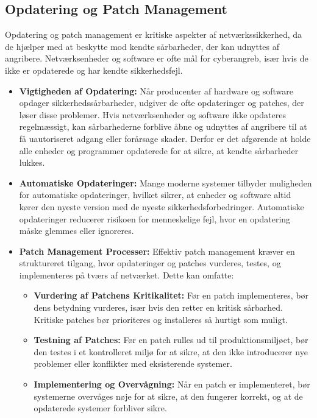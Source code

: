 \subsection{Opdatering og Patch Management}
Opdatering og patch management er kritiske aspekter af netværkssikkerhed, da de hjælper med at beskytte mod kendte sårbarheder, der kan udnyttes af angribere. Netværksenheder og software er ofte mål for cyberangreb, især hvis de ikke er opdaterede og har kendte sikkerhedsfejl.

\begin{itemize}
	\item \textbf{Vigtigheden af Opdatering:} Når producenter af hardware og software opdager sikkerhedssårbarheder, udgiver de ofte opdateringer og patches, der løser disse problemer. Hvis netværksenheder og software ikke opdateres regelmæssigt, kan sårbarhederne forblive åbne og udnyttes af angribere til at få uautoriseret adgang eller forårsage skader. Derfor er det afgørende at holde alle enheder og programmer opdaterede for at sikre, at kendte sårbarheder lukkes.
	
	\item \textbf{Automatiske Opdateringer:} Mange moderne systemer tilbyder muligheden for automatiske opdateringer, hvilket sikrer, at enheder og software altid kører den nyeste version med de nyeste sikkerhedsforbedringer. Automatiske opdateringer reducerer risikoen for menneskelige fejl, hvor en opdatering måske glemmes eller ignoreres.
	
	\item \textbf{Patch Management Processer:} Effektiv patch management kræver en struktureret tilgang, hvor opdateringer og patches vurderes, testes, og implementeres på tværs af netværket. Dette kan omfatte:
	\begin{itemize}
		\item \textbf{Vurdering af Patchens Kritikalitet:} Før en patch implementeres, bør dens betydning vurderes, især hvis den retter en kritisk sårbarhed. Kritiske patches bør prioriteres og installeres så hurtigt som muligt.
		\item \textbf{Testning af Patches:} Før en patch rulles ud til produktionsmiljøet, bør den testes i et kontrolleret miljø for at sikre, at den ikke introducerer nye problemer eller konflikter med eksisterende systemer.
		\item \textbf{Implementering og Overvågning:} Når en patch er implementeret, bør systemerne overvåges nøje for at sikre, at den fungerer korrekt, og at de opdaterede systemer forbliver sikre.
	\end{itemize}
	

\end{itemize}
